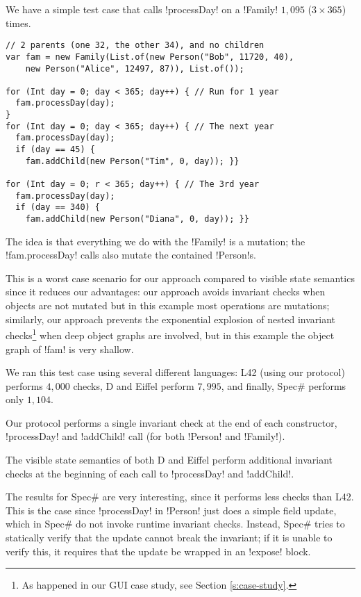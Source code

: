 \loseSpace
We have a simple test case that calls \Q!processDay! on a \Q!Family! $1{,}095$ ($3\times365$) times.
\begin{lstlisting}
// 2 parents (one 32, the other 34), and no children
var fam = new Family(List.of(new Person("Bob", 11720, 40),
    new Person("Alice", 12497, 87)), List.of());
    
for (Int day = 0; day < 365; day++) { // Run for 1 year
  fam.processDay(day);
}
for (Int day = 0; day < 365; day++) { // The next year
  fam.processDay(day);
  if (day == 45) {
    fam.addChild(new Person("Tim", 0, day)); }}

for (Int day = 0; r < 365; day++) { // The 3rd year
  fam.processDay(day);
  if (day == 340) {
    fam.addChild(new Person("Diana", 0, day)); }}
\end{lstlisting}

The idea is that everything we do with the \Q!Family! is a mutation; the \Q!fam.processDay! calls also mutate the contained \Q!Person!s.

This is a worst case scenario for our approach compared to visible state semantics since it reduces our advantages:
our approach avoids invariant checks when objects are not mutated
but in this example most operations are mutations; 
similarly, our approach prevents the exponential explosion of nested invariant checks\footnote{As happened in our GUI case study, see Section \ref{s:case-study}.} when deep object graphs are involved, but in this example the object graph of \Q!fam! is very shallow.
\loseSpace

We ran this test case using several different languages: L42 (using our protocol) performs $4{,}000$ checks, D and Eiffel perform $7{,}995$, and finally, Spec\# performs only $1{,}104$.

Our protocol performs a single invariant check at the end of each constructor,  \Q!processDay! and \Q!addChild! call (for both \Q!Person! and \Q!Family!). 

The visible state semantics of both D and Eiffel perform additional invariant checks at the beginning of each call to \Q!processDay! and \Q!addChild!.

The results for Spec\# are very interesting, since it performs less checks than L42.
This is the case since \Q!processDay! in \Q!Person! just does a simple field update, which in Spec\# do not invoke runtime invariant checks. Instead, Spec\# tries to statically verify that the update cannot break the invariant; if it is unable to verify this, it requires that the update be wrapped in an \Q!expose! block. 

